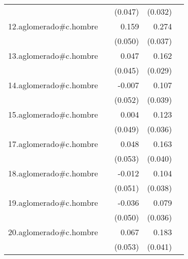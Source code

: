 {\begin{longtable}{l*{4}{D{.}{.}{-1}}}
            &                     &     (0.047)         &     (0.032)         &                     \\
\addlinespace
12.aglomerado#c.hombre&                     &       0.159\sym{**} &       0.274\sym{***}&                     \\
            &                     &     (0.050)         &     (0.037)         &                     \\
\addlinespace
13.aglomerado#c.hombre&                     &       0.047         &       0.162\sym{***}&                     \\
            &                     &     (0.045)         &     (0.029)         &                     \\
\addlinespace
14.aglomerado#c.hombre&                     &      -0.007         &       0.107\sym{**} &                     \\
            &                     &     (0.052)         &     (0.039)         &                     \\
\addlinespace
15.aglomerado#c.hombre&                     &       0.004         &       0.123\sym{***}&                     \\
            &                     &     (0.049)         &     (0.036)         &                     \\
\addlinespace
17.aglomerado#c.hombre&                     &       0.048         &       0.163\sym{***}&                     \\
            &                     &     (0.053)         &     (0.040)         &                     \\
\addlinespace
18.aglomerado#c.hombre&                     &      -0.012         &       0.104\sym{**} &                     \\
            &                     &     (0.051)         &     (0.038)         &                     \\
\addlinespace
19.aglomerado#c.hombre&                     &      -0.036         &       0.079\sym{*}  &                     \\
            &                     &     (0.050)         &     (0.036)         &                     \\
\addlinespace
20.aglomerado#c.hombre&                     &       0.067         &       0.183\sym{***}&                     \\
            &                     &     (0.053)         &     (0.041)         &                     \\

\end{longtable}}
